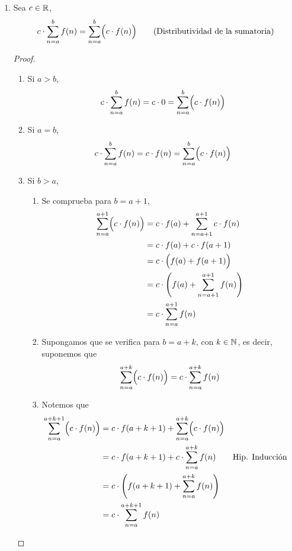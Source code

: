 \begin{enumerate}[label=\alph*)]
  \item Sea $c\in \mathbb{R}$, \[c\cdot \sum_{n=a}^{b} f(n) = \sum_{n=a}^{b} \Bigl(c \cdot f(n)\Bigr) \qquad \text{(Distributividad de la sumatoria)}\]
    \begin{proof}\leavevmode
      \begin{enumerate}[label=\Roman*)]
        \item Si $a>b$, \begin{align*}
          c\cdot \sum_{n=a}^{b} f(n) = c\cdot 0 = \sum_{n=a}^{b} \Bigl(c \cdot f(n)\Bigr)
        \end{align*}
        \item Si $a=b$, \begin{align*}
          c\cdot \sum_{n=a}^{b} f(n) = c\cdot f(n) = \sum_{n=a}^{b} \Bigl(c \cdot f(n)\Bigr) 
        \end{align*}
        \item Si $b>a$,
          \begin{enumerate}[label=\roman*)]
          \item Se comprueba para $b=a+1$, \begin{align*}
            \sum_{n=a}^{a+1} \Bigl(c \cdot f(n)\Bigr) &= c\cdot f(a) + \sum_{n=a+1}^{a+1} c\cdot f(n)\\
            &= c\cdot f(a) + c\cdot f(a+1)\\
            &= c \cdot \Bigl(f(a) + f(a+1)\Bigr)\\
            &= c\cdot \Biggl(f(a) + \sum_{n=a+1}^{a+1} f(n)\Biggr)\\
            &= c\cdot \sum_{n=a}^{a+1} f(n)
          \end{align*}
          \item Supongamos que se verifica para $b=a+k$, con $k\in \mathbb{N}$, es decir, suponemos que \begin{align*}
            \sum_{n=a}^{a+k} \Bigl(c \cdot f(n)\Bigr) = c\cdot \sum_{n=a}^{a+k} f(n) 
          \end{align*}
          \item Notemos que \begin{align*}
            \sum_{n=a}^{a+k+1} \Bigl(c \cdot f(n)\Bigr) &= c\cdot f(a+k+1) + \sum_{n=a}^{a+k} \Bigl(c \cdot f(n)\Bigr)\\
            &= c\cdot f(a+k+1) + c\cdot \sum_{n=a}^{a+k} f(n) && \text{Hip. Inducción}\\
            &= c \cdot \Biggl(f(a+k+1)+ \sum_{n=a}^{a+k} f(n)\Biggr)\\
            &= c\cdot \sum_{n=a}^{a+k+1} f(n)
          \end{align*}
          \end{enumerate}
        \end{enumerate}
    \end{proof}
  

\end{enumerate}
